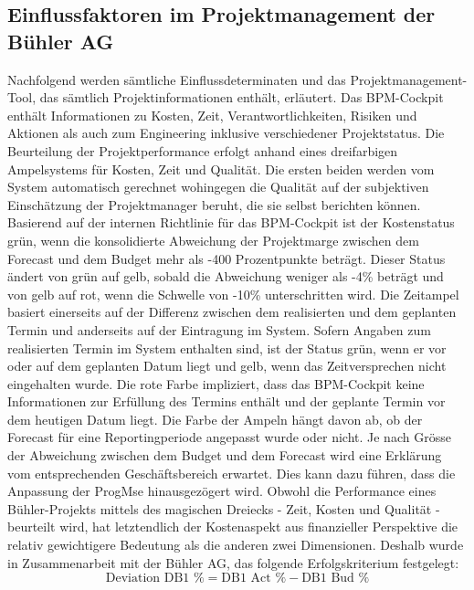 \subsection{Einflussfaktoren im Projektmanagement der Bühler AG}\label{zweizwei}
Nachfolgend werden sämtliche Einflussdeterminaten und das Projektmanagement-Tool, das sämtlich Projektinformationen enthält, erläutert.
\newline
Das BPM-Cockpit enthält Informationen zu Kosten, Zeit, Verantwortlichkeiten, Risiken und Aktionen als auch zum Engineering inklusive verschiedener Projektstatus. Die Beurteilung der Projektperformance erfolgt anhand eines dreifarbigen Ampelsystems für Kosten, Zeit und Qualität. Die ersten beiden werden vom System automatisch gerechnet wohingegen die Qualität auf der subjektiven Einschätzung der Projektmanager beruht, die sie selbst berichten können. Basierend auf der internen Richtlinie für das BPM-Cockpit ist der Kostenstatus grün, wenn die konsolidierte Abweichung der Projektmarge zwischen dem Forecast und dem Budget mehr als -400 Prozentpunkte beträgt. Dieser Status ändert von grün auf gelb, sobald die Abweichung weniger als -4\% beträgt und von gelb auf rot, wenn die Schwelle von -10\% unterschritten wird. Die Zeitampel basiert einerseits auf der Differenz zwischen dem realisierten und dem geplanten Termin und anderseits auf der Eintragung im System. Sofern Angaben zum realisierten Termin im System enthalten sind, ist der Status grün, wenn er vor oder auf dem geplanten Datum liegt und gelb, wenn das Zeitversprechen nicht eingehalten wurde. Die rote Farbe impliziert, dass das BPM-Cockpit keine Informationen zur Erfüllung des Termins enthält und der geplante Termin vor dem heutigen Datum liegt. Die Farbe der Ampeln hängt davon ab, ob der Forecast für eine Reportingperiode angepasst wurde oder nicht. Je nach Grösse der Abweichung zwischen dem Budget und dem Forecast wird eine Erklärung vom entsprechenden Geschäftsbereich erwartet. Dies kann dazu führen, dass die Anpassung der ProgMse hinausgezögert wird.
\newline
Obwohl die Performance eines Bühler-Projekts mittels des magischen Dreiecks - Zeit, Kosten und Qualität - beurteilt wird, hat letztendlich der Kostenaspekt aus finanzieller Perspektive die relativ gewichtigere Bedeutung als die anderen zwei Dimensionen. Deshalb wurde in Zusammenarbeit mit der Bühler AG, das folgende Erfolgskriterium festgelegt:
\begin{equation}
	\text{Deviation DB1 \%} = \text{DB1 Act \%} - \text{DB1 Bud \%}
\end{equation}
